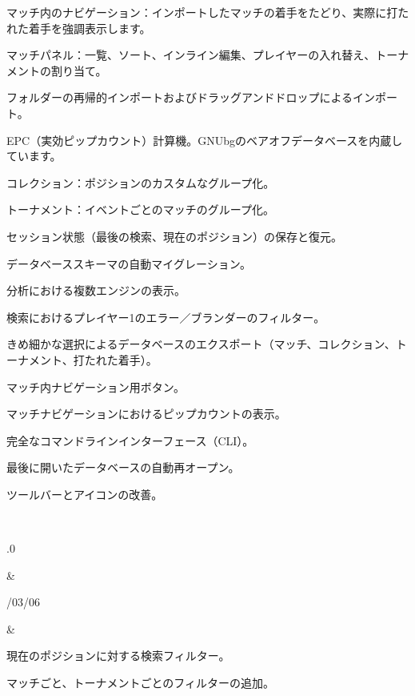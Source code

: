 \documentclass[letterpaper,10pt,dvipdfmx]{sphinxmanual}
\begin{document}
\begin{savenotes}
\begin{longtable}{}
\begin{varwidth}[t]{}
\sphinxAtStartPar
マッチ内のナビゲーション：インポートしたマッチの着手をたどり、実際に打たれた着手を強調表示します。

\sphinxAtStartPar
マッチパネル：一覧、ソート、インライン編集、プレイヤーの入れ替え、トーナメントの割り当て。

\sphinxAtStartPar
フォルダーの再帰的インポートおよびドラッグアンドドロップによるインポート。

\sphinxAtStartPar
EPC（実効ピップカウント）計算機。GNUbgのベアオフデータベースを内蔵しています。

\sphinxAtStartPar
コレクション：ポジションのカスタムなグループ化。

\sphinxAtStartPar
トーナメント：イベントごとのマッチのグループ化。

\sphinxAtStartPar
セッション状態（最後の検索、現在のポジション）の保存と復元。

\sphinxAtStartPar
データベーススキーマの自動マイグレーション。

\sphinxAtStartPar
分析における複数エンジンの表示。

\sphinxAtStartPar
検索におけるプレイヤー1のエラー／ブランダーのフィルター。

\sphinxAtStartPar
きめ細かな選択によるデータベースのエクスポート（マッチ、コレクション、トーナメント、打たれた着手）。

\sphinxAtStartPar
マッチ内ナビゲーション用ボタン。

\sphinxAtStartPar
マッチナビゲーションにおけるピップカウントの表示。

\sphinxAtStartPar
完全なコマンドラインインターフェース（CLI）。

\sphinxAtStartPar
最後に開いたデータベースの自動再オープン。

\sphinxAtStartPar
ツールバーとアイコンの改善。
\sphinxbeforeendvarwidth
\end{varwidth}%
\\
\sphinxhline\begin{varwidth}[t]{}
.0
\sphinxbeforeendvarwidth
\end{varwidth}%
&\begin{varwidth}[t]{}
/03/06
\sphinxbeforeendvarwidth
\end{varwidth}%
&\begin{varwidth}[t]{}
\sphinxAtStartPar
現在のポジションに対する検索フィルター。

\sphinxAtStartPar
マッチごと、トーナメントごとのフィルターの追加。


\end{varwidth}
\end{longtable}
\end{savenotes}
\end{document}
